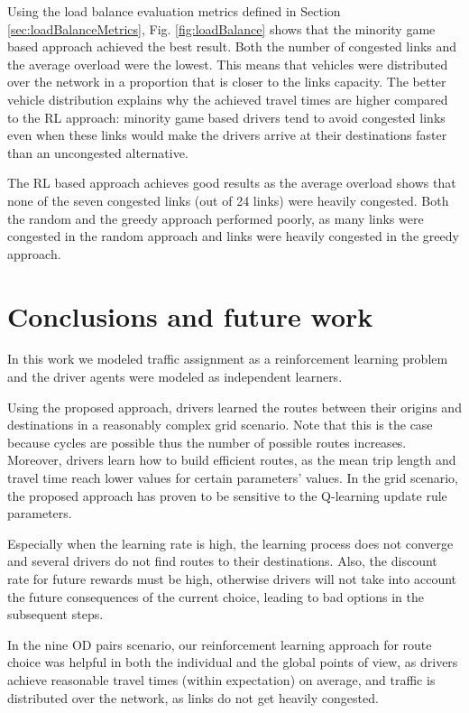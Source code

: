 \documentclass{RITA}
\begin{document}
Using the load balance evaluation metrics defined in Section \ref{sec:loadBalanceMetrics}, Fig. \ref{fig:loadBalance} shows that the minority game based approach achieved the best result. Both the number of congested links and the average overload were the lowest. This means that vehicles were distributed over the network in a proportion that is closer to the links capacity. The better vehicle distribution explains why the achieved travel times are higher compared to the RL approach: minority game based drivers tend to avoid congested links even when these links would make the drivers arrive at their destinations faster than an uncongested alternative. 

The RL based approach achieves good results as the average overload shows that none of the seven congested links (out of 24 links) were heavily congested. Both the random and the greedy approach performed poorly, as many links were congested in the random approach and links were heavily congested in the greedy approach.



\section{Conclusions and future work}
\label{sec:conclusions}

In this work we modeled traffic assignment as a reinforcement learning problem and the driver agents were modeled as independent learners.

Using the proposed approach, drivers learned the routes between their origins and destinations in a reasonably complex grid scenario. Note that this is the case because cycles are possible thus the number of possible routes increases. Moreover, drivers learn how to build efficient routes, as the mean trip length and travel time reach lower values for certain parameters' values. In the grid scenario, the proposed approach has proven to be sensitive to the Q-learning update rule parameters. 

Especially when the learning rate is high, the learning process does not converge and several drivers do not find routes to their destinations. Also, the discount rate for future rewards must be high, otherwise drivers will not take into account the future consequences of the current choice, leading to bad options in the subsequent steps.

In the nine OD pairs scenario, our reinforcement learning approach for route choice was helpful in both the individual and the global points of view, as drivers achieve reasonable travel times (within expectation) on average, and traffic is distributed over the network, as links do not get heavily congested.
\end{document}
